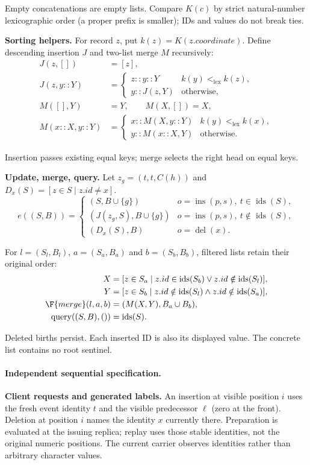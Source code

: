 Empty concatenations are empty lists. Compare $K(c)$ by strict natural-number lexicographic order (a proper prefix is smaller); IDs and values do not break ties.

\textbf{Sorting helpers.} For record $z$, put $k(z)=K(z.coordinate)$. Define descending insertion $J$ and two-list merge $M$ recursively:
\[
\begin{aligned}J(z,[])&=[z],\\J(z,y::Y)&=\begin{cases}z::y::Y&k(y)<_{\mathrm{lex}}k(z),\\y::J(z,Y)&\text{otherwise},\end{cases}\\M([],Y)&=Y,\qquad M(X,[])=X,\\M(x::X,y::Y)&=\begin{cases}x::M(X,y::Y)&k(y)<_{\mathrm{lex}}k(x),\\y::M(x::X,Y)&\text{otherwise}.\end{cases}\end{aligned}
\]

Insertion passes existing equal keys; merge selects the right head on equal keys.

\textbf{Update, merge, query.} Let $z_g=(t,t,C(h))$ and $D_x(S)=[z\in S\mid z.id\ne x]$.
\[
e((S,B))=\begin{cases}(S,B\cup\{g\})&o=\operatorname{ins}(p,s),\ t\in\operatorname{ids}(S),\\(J(z_g,S),B\cup\{g\})&o=\operatorname{ins}(p,s),\ t\notin\operatorname{ids}(S),\\(D_x(S),B)&o=\operatorname{del}(x).\end{cases}
\]

For $l=(S_l,B_l)$, $a=(S_a,B_a)$ and $b=(S_b,B_b)$, filtered lists retain their original order:
\[
\begin{aligned}X&=[z\in S_a\mid z.id\in\operatorname{ids}(S_b)\lor z.id\notin\operatorname{ids}(S_l)],\\Y&=[z\in S_b\mid z.id\notin\operatorname{ids}(S_l)\land z.id\notin\operatorname{ids}(S_a)],\\\F{merge}(l,a,b)&=(M(X,Y),B_a\cup B_b),\\\operatorname{query}((S,B),())&=\operatorname{ids}(S).\end{aligned}
\]

Deleted births persist. Each inserted ID is also its displayed value. The concrete list contains no root sentinel.


\paragraph{Independent sequential specification.}
\textbf{Client requests and generated labels.} An insertion at visible position $i$ uses the fresh event identity $t$ and the visible predecessor $\ell$ (zero at the front). Deletion at position $i$ names the identity $x$ currently there. Preparation is evaluated at the issuing replica; replay uses those stable identities, not the original numeric positions. The current carrier observes identities rather than arbitrary character values.

